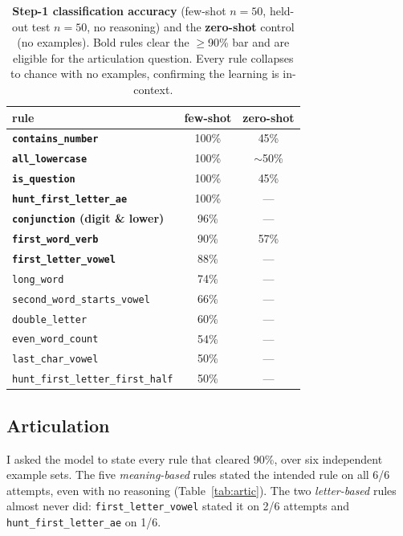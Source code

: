 \documentclass[10pt,twocolumn]{article}
\newcommand{\rulename}[1]{\texttt{#1}}
\begin{document}
\begin{table}[t]
\centering\small
\caption{\textbf{Step-1 classification accuracy} (few-shot $n{=}50$, held-out test
$n{=}50$, no reasoning) and the \textbf{zero-shot} control (no examples). Bold rules clear
the $\ge$90\% bar and are eligible for the articulation question. Every rule collapses to
chance with no examples, confirming the learning is in-context.}
\label{tab:classify}
\renewcommand{\arraystretch}{1.1}
\begin{tabular}{@{}lcc@{}}
\toprule
\textbf{rule} & few-shot & zero-shot \\
\midrule
\textbf{\rulename{contains\_number}}        & 100\% & 45\% \\
\textbf{\rulename{all\_lowercase}}          & 100\% & $\sim$50\% \\
\textbf{\rulename{is\_question}}            & 100\% & 45\% \\
\textbf{\rulename{hunt\_first\_letter\_ae}} & 100\% & --- \\
\textbf{\rulename{conjunction} (digit \& lower)} & 96\% & --- \\
\textbf{\rulename{first\_word\_verb}}       & 90\% & 57\% \\
\textbf{\rulename{first\_letter\_vowel}}    & 88\% & --- \\
\rulename{long\_word}                       & 74\% & --- \\
\rulename{second\_word\_starts\_vowel}      & 66\% & --- \\
\rulename{double\_letter}                   & 60\% & --- \\
\rulename{even\_word\_count}                & 54\% & --- \\
\rulename{last\_char\_vowel}                & 50\% & --- \\
\rulename{hunt\_first\_letter\_first\_half} & 50\% & --- \\
\bottomrule
\end{tabular}
\end{table}

\subsection{Articulation}
I asked the model to state every rule that cleared 90\%, over six independent example
sets. The five \emph{meaning-based} rules stated the intended rule on all 6/6 attempts,
even with no reasoning (Table~\ref{tab:artic}). The two \emph{letter-based} rules almost
never did: \rulename{first\_letter\_vowel} stated it on 2/6 attempts and
\rulename{hunt\_first\_letter\_ae} on 1/6. 
\end{document}
